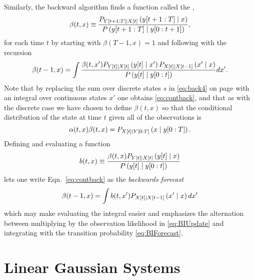 Similarly, the backward algorithm finds a function called the
,
\begin{equation}
  \label{eq:contbeta}
  \beta(t,x) \equiv \frac{P_{Y[t+1:T]\mid {X}{[t]}}
  \left(y[t+1:T]\mid x \right)}{P\left(y[t+1:T]\mid y[0:t+1]
               \right)},
\end{equation}
for each time $t$ by starting with $\beta(T-1,x) = 1$ and following with
the recursion
\begin{equation}
  \label{eq:contback}
  \beta(t-1,x) = \int 
  \frac{\beta(t,x') P_{{Y}{[t]}\mid {X}{[t]}}\left({y}{[t]}\mid x' \right)
  P_{{X}{[t]}\mid {X}{[t-1]}}\left(x'\mid x \right)}
  {P\left({y}{[t]}\mid y[0:t] \right)} dx'.
\end{equation}
Note that by replacing the sum over discrete states $s$ in
\eqref{eq:back4} on page \pageref{eq:back4} with an integral over
continuous states $x'$ one obtains \eqref{eq:contback}, and that as
with the discrete case we have chosen to define $\beta(t,x)$ so that
the conditional distribution of the state at time $t$ given all of the
observations is
\begin{equation}
  \label{eq:contalphabeta}
  \alpha(t,x) \beta(t,x) = P_{{X}{[t]}\mid Y[0:T]}
  \left(x\mid y[0:T] \right).
\end{equation}
Defining and evaluating a \emph{} function
\begin{equation}
  \label{eq:BIUpdate}
  b(t,x) \equiv \frac{\beta(t,x)
    P_{{Y}{[t]}\mid {X}{[t]}}\left({y}{[t]}\mid x
    \right)} {P\left({y}{[t]}\mid y[0:t] \right)}
\end{equation}
lets one write Eqn.~\eqref{eq:contback} as the \emph{backwards forecast}
\begin{equation}
  \label{eq:BIForecast}
  \beta(t-1,x) = \int b(t,x') P_{{X}{[t]}\mid {X}{[t-1]}}\left(x'\mid x
  \right) dx'
\end{equation}
which may make evaluating the integral easier and emphasizes the
alternation between multiplying by the observation likelihood in
\eqref{eq:BIUpdate} and integrating with the transition probability
\eqref{eq:BIForecast}.

\section{Linear Gaussian Systems}
\label{sec:LinearGaussian}

